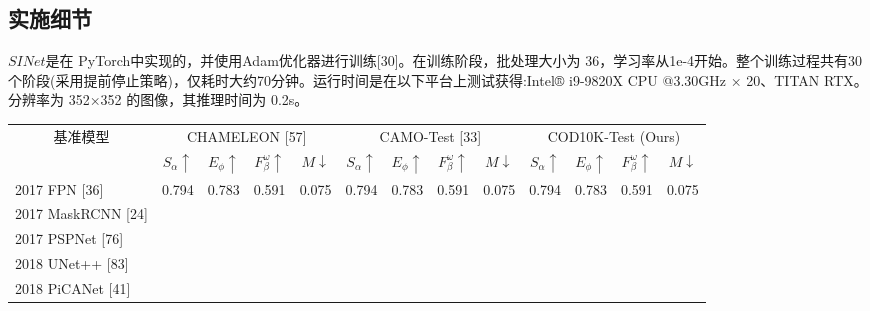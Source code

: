 \documentclass[final]{cvpr}
\begin{document}
\subsection{实施细节}
$SINet$是在 PyTorch中实现的，并使用Adam优化器进行训练[30]。在训练阶段，批处理大小为 36，学习率从1e-4开始。整个训练过程共有30个阶段(采用提前停止策略)，仅耗时大约70分钟。运行时间是在以下平台上测试获得:Intel® i9-9820X CPU @3.30GHz × 20、TITAN RTX。分辨率为 352×352 的图像，其推理时间为 0.2s。
\begin{table}[]
\resizebox{\textwidth}{!}
    {
        \begin{tabular}{l|llll||llll||llll}
        \hline
        \multicolumn{1}{c|}{\multirow{2}{*}{基准模型}} &
          \multicolumn{4}{c||}{CHAMELEON {[}57{]}} &
          \multicolumn{4}{c||}{CAMO-Test {[}33{]}} &
          \multicolumn{4}{c}{COD10K-Test   (Ours)} \\ \cline{2-13} 
        \multicolumn{1}{c|}{} &
          \multicolumn{1}{c}{$S_{\alpha } \uparrow$ } &
          \multicolumn{1}{c}{$E_{\phi } \uparrow$ } &
          \multicolumn{1}{c}{$F_{\beta }^{\omega } \uparrow $} &
          \multicolumn{1}{c||}{$M\downarrow $} &
          \multicolumn{1}{c}{$S_{\alpha } \uparrow$} &
          \multicolumn{1}{c}{$E_{\phi } \uparrow$} &
          \multicolumn{1}{c}{$F_{\beta }^{\omega } \uparrow $} &
          \multicolumn{1}{c||}{$M\downarrow $} &
          \multicolumn{1}{c}{$S_{\alpha } \uparrow$} &
          \multicolumn{1}{c}{$E_{\phi } \uparrow$} &
          \multicolumn{1}{c}{$F_{\beta }^{\omega } \uparrow $} &
          \multicolumn{1}{c}{$M\downarrow $} \\ \hline
        2017 FPN {[}36{]}               & 0.794 & 0.783 & 0.591 & 0.075 & 0.794 & 0.783 & 0.591 & 0.075 & 0.794 & 0.783 & 0.591 & 0.075 \\
        2017 MaskRCNN {[}24{]}          &       &       &       &       &       &       &       &       &       &       &       &       \\
        2017 PSPNet {[}76{]}            &       &       &       &       &       &       &       &       &       &       &       &       \\
        2018 UNet++ {[}83{]}            &       &       &       &       &       &       &       &       &       &       &       &       \\
        2018 PiCANet {[}41{]}           &       &       &       &       &       &       &       &       &       &       &       &       \\

\end{tabular}}
\end{table}
\end{document}
